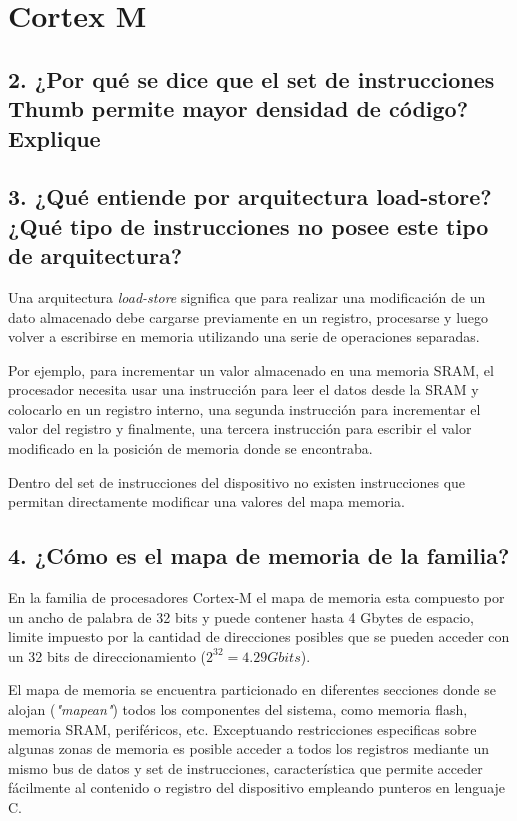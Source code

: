 \documentclass[10pt,a4paper,twoside,spanish]{article}	%
\begin{document}
\section*{Cortex M}
%
%
\subsection*{2. ¿Por qué se dice que el set de instrucciones Thumb permite mayor densidad de código? Explique}




\subsection*{3. ¿Qué entiende por arquitectura load-store? ¿Qué tipo de instrucciones no posee este tipo de arquitectura?}


Una arquitectura \textit{load-store} significa que para realizar una modificación de un dato almacenado debe cargarse previamente en un registro, procesarse y luego volver a escribirse en memoria utilizando una serie de operaciones separadas. 

Por ejemplo, para incrementar un valor almacenado en una memoria SRAM, el procesador necesita usar una instrucción para leer el datos desde la SRAM y colocarlo en un registro interno, una segunda instrucción para incrementar el valor del registro y finalmente, una tercera instrucción para escribir el valor modificado en la posición de memoria donde se encontraba.  

Dentro del set de instrucciones del dispositivo no existen instrucciones que permitan directamente modificar una valores del mapa memoria.


\subsection*{4. ¿Cómo es el mapa de memoria de la familia?}

En la familia de procesadores Cortex-M el mapa de memoria esta compuesto por un ancho de palabra de 32 bits y puede contener hasta 4 Gbytes de espacio, limite impuesto por la cantidad de direcciones posibles que se pueden acceder con un 32 bits de direccionamiento ($2^{32}=4.29 Gbits$).

El mapa de memoria se encuentra particionado en diferentes secciones donde se alojan (\textit{"mapean"}) todos los componentes del sistema, como memoria flash, memoria SRAM, periféricos, etc. Exceptuando restricciones especificas sobre algunas zonas de memoria es posible acceder a todos los registros mediante un mismo bus de datos y set de instrucciones, característica que permite acceder fácilmente al contenido o registro del dispositivo empleando punteros en lenguaje C.  
\end{document}
